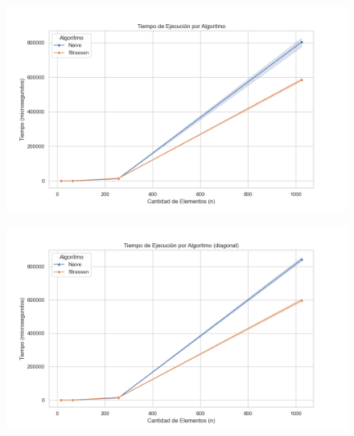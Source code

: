 \begin{figure}[H]
    \centering
    \begin{minipage}[t]{1\textwidth}
        \includegraphics[width=\textwidth]{../code/matrix_multiplication/data/plots/tiempo_vs_algoritmo.png}
     \end{minipage}%
    \caption{}
    \label{fig:scatterplot_3}
\end{figure}

\begin{figure}[H]
    \centering
    \begin{minipage}[t]{1\textwidth}
        \includegraphics[width=\textwidth]{../code/matrix_multiplication/data/plots/tiempo_vs_algoritmo_diagonal.png}
     \end{minipage}%
    \caption{}
    \label{fig:scatterplot_3}
\end{figure}


